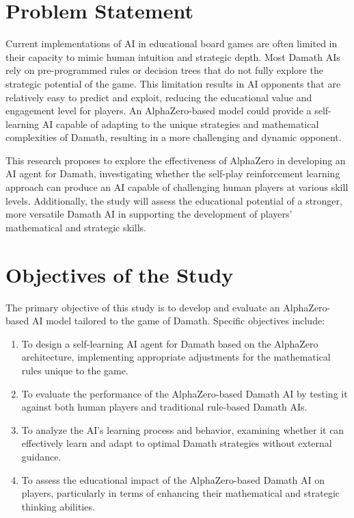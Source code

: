 \section{Problem Statement}

Current implementations of AI in educational board games are often limited in their capacity to mimic human intuition and strategic depth. Most Damath AIs rely on pre-programmed rules or decision trees that do not fully explore the strategic potential of the game. This limitation results in AI opponents that are relatively easy to predict and exploit, reducing the educational value and engagement level for players. An AlphaZero-based model could provide a self-learning AI capable of adapting to the unique strategies and mathematical complexities of Damath, resulting in a more challenging and dynamic opponent.

This research proposes to explore the effectiveness of AlphaZero in developing an AI agent for Damath, investigating whether the self-play reinforcement learning approach can produce an AI capable of challenging human players at various skill levels. Additionally, the study will assess the educational potential of a stronger, more versatile Damath AI in supporting the development of players’ mathematical and strategic skills.

\section{Objectives of the Study}

The primary objective of this study is to develop and evaluate an AlphaZero-based AI model tailored to the game of Damath. Specific objectives include:
\begin{enumerate}
    \item To design a self-learning AI agent for Damath based on the AlphaZero architecture, implementing appropriate adjustments for the mathematical rules unique to the game.
    \item To evaluate the performance of the AlphaZero-based Damath AI by testing it against both human players and traditional rule-based Damath AIs.
    \item To analyze the AI’s learning process and behavior, examining whether it can effectively learn and adapt to optimal Damath strategies without external guidance.
    \item To assess the educational impact of the AlphaZero-based Damath AI on players, particularly in terms of enhancing their mathematical and strategic thinking abilities.
\end{enumerate}


